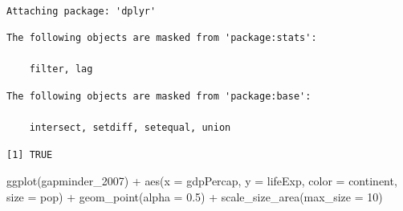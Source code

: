 \documentclass[
  letterpaper,
  DIV=11,
  numbers=noendperiod]{scrartcl}
\newenvironment{Shaded}{\begin{snugshade}}{\end{snugshade}}
\newcommand{\AttributeTok}[1]{\textcolor[rgb]{0.40,0.45,0.13}{#1}}
\newcommand{\DecValTok}[1]{\textcolor[rgb]{0.68,0.00,0.00}{#1}}
\newcommand{\DocumentationTok}[1]{\textcolor[rgb]{0.37,0.37,0.37}{\textit{#1}}}
\newcommand{\FloatTok}[1]{\textcolor[rgb]{0.68,0.00,0.00}{#1}}
\newcommand{\FunctionTok}[1]{\textcolor[rgb]{0.28,0.35,0.67}{#1}}
\newcommand{\NormalTok}[1]{\textcolor[rgb]{0.00,0.23,0.31}{#1}}
\newcommand{\OtherTok}[1]{\textcolor[rgb]{0.00,0.23,0.31}{#1}}
\newcommand{\SpecialCharTok}[1]{\textcolor[rgb]{0.37,0.37,0.37}{#1}}
\newcommand{\StringTok}[1]{\textcolor[rgb]{0.13,0.47,0.30}{#1}}
\begin{document}
\begin{verbatim}

Attaching package: 'dplyr'
\end{verbatim}

\begin{verbatim}
The following objects are masked from 'package:stats':

    filter, lag
\end{verbatim}

\begin{verbatim}
The following objects are masked from 'package:base':

    intersect, setdiff, setequal, union
\end{verbatim}

\begin{Shaded}
\end{Shaded}

\begin{verbatim}
[1] TRUE
\end{verbatim}

\begin{Shaded}
\begin{Highlighting}[]
\FunctionTok{ggplot}\NormalTok{(gapminder\_2007) }\SpecialCharTok{+}
  \FunctionTok{aes}\NormalTok{(}\AttributeTok{x =}\NormalTok{ gdpPercap, }\AttributeTok{y =}\NormalTok{ lifeExp, }\AttributeTok{color =}\NormalTok{ continent, }\AttributeTok{size =}\NormalTok{ pop) }\SpecialCharTok{+}
  \FunctionTok{geom\_point}\NormalTok{(}\AttributeTok{alpha =} \FloatTok{0.5}\NormalTok{) }\SpecialCharTok{+}
  \FunctionTok{scale\_size\_area}\NormalTok{(}\AttributeTok{max\_size =} \DecValTok{10}\NormalTok{)}
\end{Highlighting}
\end{Shaded}
\end{document}

